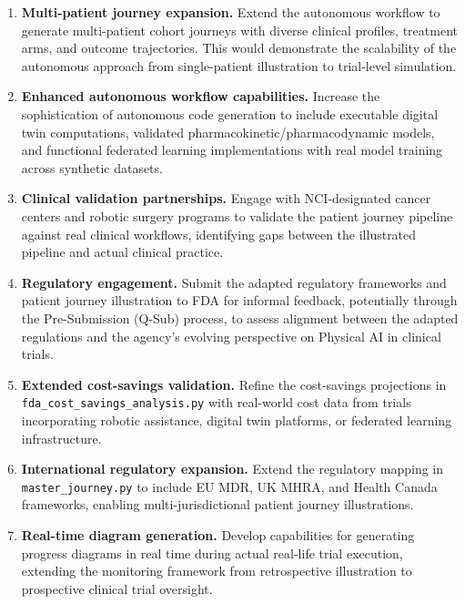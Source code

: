 \begin{enumerate}[leftmargin=*]
\item \textbf{Multi-patient journey expansion.} Extend the autonomous workflow to generate multi-patient cohort journeys with diverse clinical profiles, treatment arms, and outcome trajectories. This would demonstrate the scalability of the autonomous approach from single-patient illustration to trial-level simulation.

\item \textbf{Enhanced autonomous workflow capabilities.} Increase the sophistication of autonomous code generation to include executable digital twin computations, validated pharmacokinetic/pharmacodynamic models, and functional federated learning implementations with real model training across synthetic datasets.

\item \textbf{Clinical validation partnerships.} Engage with NCI-designated cancer centers and robotic surgery programs to validate the patient journey pipeline against real clinical workflows, identifying gaps between the illustrated pipeline and actual clinical practice.

\item \textbf{Regulatory engagement.} Submit the adapted regulatory frameworks and patient journey illustration to FDA for informal feedback, potentially through the Pre-Submission (Q-Sub) process, to assess alignment between the adapted regulations and the agency's evolving perspective on Physical AI in clinical trials.

\item \textbf{Extended cost-savings validation.} Refine the cost-savings projections in \texttt{fda\_cost\_savings\_analysis.py} with real-world cost data from trials incorporating robotic assistance, digital twin platforms, or federated learning infrastructure.

\item \textbf{International regulatory expansion.} Extend the regulatory mapping in \texttt{master\_journey.py} to include EU MDR, UK MHRA, and Health Canada frameworks, enabling multi-jurisdictional patient journey illustrations.

\item \textbf{Real-time diagram generation.} Develop capabilities for generating progress diagrams in real time during actual real-life trial execution, extending the monitoring framework from retrospective illustration to prospective clinical trial oversight.
\end{enumerate}

